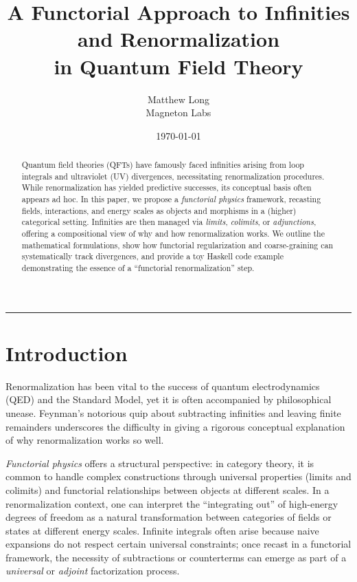 \documentclass[12pt]{article}
\title{\bf A Functorial Approach to Infinities and Renormalization \\ in Quantum Field Theory}
\author{Matthew Long \\
Magneton Labs}
\date{\today}
\begin{document}
\maketitle

\begin{abstract}
Quantum field theories (QFTs) have famously faced infinities arising from loop integrals and ultraviolet (UV) divergences, 
necessitating renormalization procedures. While renormalization has yielded predictive successes, its conceptual basis 
often appears ad hoc. In this paper, we propose a \emph{functorial physics} framework, recasting fields, interactions, 
and energy scales as objects and morphisms in a (higher) categorical setting. Infinities are then managed via 
\emph{limits}, \emph{colimits}, or \emph{adjunctions}, offering a compositional view of why and how renormalization works. 
We outline the mathematical formulations, show how functorial regularization and coarse-graining can systematically track divergences, 
and provide a toy Haskell code example demonstrating the essence of a ``functorial renormalization'' step. 
\end{abstract}

\hrule
\vspace{1em}

\section{Introduction}
Renormalization has been vital to the success of quantum electrodynamics (QED) and the Standard Model, 
yet it is often accompanied by philosophical unease. Feynman's notorious quip about subtracting infinities 
and leaving finite remainders underscores the difficulty in giving a rigorous conceptual explanation of 
why renormalization works so well. 

\emph{Functorial physics} offers a structural perspective: in category theory, it is common to handle complex constructions 
through universal properties (limits and colimits) and functorial relationships between objects at different scales. 
In a renormalization context, one can interpret the “integrating out” of high-energy degrees of freedom as a natural transformation 
between categories of fields or states at different energy scales. Infinite integrals often arise because naive expansions 
do not respect certain universal constraints; once recast in a functorial framework, the necessity of subtractions 
or counterterms can emerge as part of a \emph{universal} or \emph{adjoint} factorization process.
\end{document}
